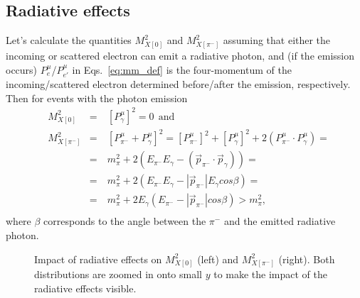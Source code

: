 \subsection* {Radiative effects}
\vspace{-0.5em}
Let's calculate the quantities $M_{X[0]}^{2}$ and $M_{X[\pi^{-}]}^{2}$ assuming that either the incoming or scattered electron can emit a radiative photon, and (if the emission occurs) $P_{e}^{\mu}$/$P_{e'}^{\mu}$ in Eqs.~\eqref{eq:mm_def} is the four-momentum of the incoming/scattered electron determined before/after the emission, respectively. Then for events with the photon emission\vspace{-0.5em}
\begin{equation}
\begin{aligned}
&M_{X[0]}^{2}&=&~[P^{\mu}_{\gamma}]^{2} = 0~~\textrm{and}\\[8pt]
&M_{X[\pi^{-}]}^{2}&=&~[P_{\pi^{-}}^{\mu}+P^{\mu}_{\gamma}]^{2}=[P^{\mu}_{\pi^{-}}]^{2} +[P^{\mu}_{\gamma}]^{2}+2(P^{\mu}_{\pi^{-}}\cdot P^{\mu}_{\gamma} ) =\\
&&=&~m_{\pi}^{2} +2(E_{\pi^{-}}E_{\gamma} - (\overrightarrow{p}_{\pi^{-}}\cdot \overrightarrow{p}_{\gamma})) = \\
&&=&~m_{\pi}^{2} +2(E_{\pi^{-}}E_{\gamma} - |\overrightarrow{p}_{\pi^{-}}|E_{\gamma}cos\beta) =\\
&&=&~ m_{\pi}^{2} +2E_{\gamma}(E_{\pi^{-}} -|\overrightarrow{p}_{\pi^{-}}|cos\beta ) >m_{\pi}^{2}   ,\\[-7pt]
\end{aligned}\label{eq:mm_rad}
\end{equation}
where $\beta$ corresponds to the angle between the $\pi^{-}$ and the emitted radiative photon.

\begin{figure}[htp]
\begin{center}
\caption{\small Impact of radiative effects on $M_{X[0]}^{2}$ (left) and $M_{X[\pi^{-}]}^{2}$ (right). Both distributions are zoomed in onto small $y$ to make the impact of the radiative effects visible.} \label{fig:mm_rad}
\end{center}
\end{figure}


